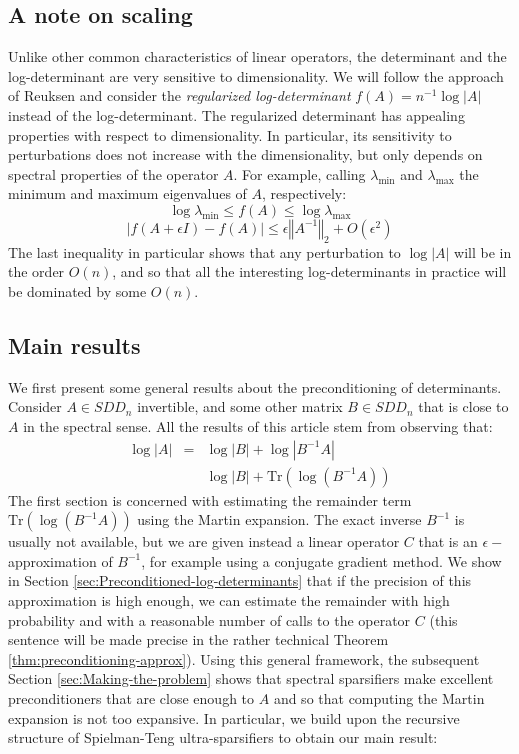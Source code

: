 \subsection{A note on scaling} Unlike other common characteristics of
linear operators, the determinant and the log-determinant are very
sensitive to dimensionality. We will follow the approach of Reuksen
\cite{Reusken2002} and consider the \emph{regularized log-determinant}
$f\left(A\right)=n^{-1}\log\left|A\right|$ instead of the log-determinant.
The regularized determinant has appealing properties with respect
to dimensionality. In particular, its sensitivity to perturbations
does not increase with the dimensionality, but only depends on spectral
properties of the operator $A$. For example, calling $\lambda_{\min}$
and $\lambda_{\max}$ the minimum and maximum eigenvalues of $A$,
respectively: 
\[
\log\lambda_{\min}\leq f\left(A\right)\leq\log\lambda_{\max}
\]
\[
\left|f\left(A+\epsilon I\right)-f\left(A\right)\right|\leq\epsilon\left\Vert A^{-1}\right\Vert _{2}+O\left(\epsilon^{2}\right)
\]
The last inequality in particular shows that any perturbation to $\log\left|A\right|$
will be in the order $O\left(n\right)$, and so that all the interesting
log-determinants in practice will be dominated by some $O\left(n\right)$.

\subsection{Main results} We first present some general results about
the preconditioning of determinants. Consider $A\in SDD_{n}$ invertible,
and some other matrix $B\in SDD_{n}$ that is close to $A$ in the
spectral sense. All the results of this article stem from observing
that:
\begin{eqnarray*}
\log\left|A\right| & = & \log\left|B\right|+\log\left|B^{-1}A\right|\\
 &  & \log\left|B\right|+\text{Tr}\left(\log\left(B^{-1}A\right)\right)
\end{eqnarray*}
The first section is concerned with estimating the remainder term $\text{Tr}\left(\log\left(B^{-1}A\right)\right)$
using the Martin expansion. The exact inverse $B^{-1}$ is usually
not available, but we are given instead a linear operator $C$ that
is an $\epsilon-$approximation of $B^{-1}$, for example using a
conjugate gradient method. We show in Section \ref{sec:Preconditioned-log-determinants}
that if the precision of this approximation is high enough, we can
estimate the remainder with high probability and with a reasonable
number of calls to the operator $C$ (this sentence will be made precise
in the rather technical Theorem \ref{thm:preconditioning-approx}).
Using this general framework, the subsequent Section \ref{sec:Making-the-problem}
shows that spectral sparsifiers make excellent preconditioners that
are close enough to $A$ and so that computing the Martin expansion
is not too expansive. In particular, we build upon the recursive structure
of Spielman-Teng ultra-sparsifiers to obtain our main result:


